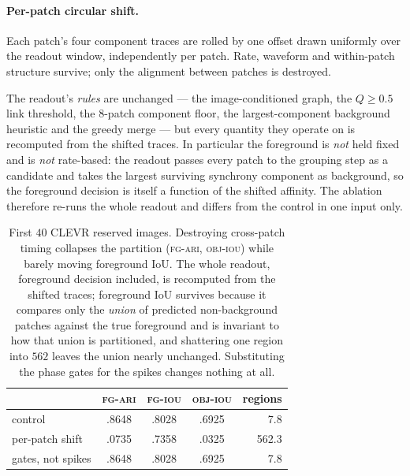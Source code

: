 \paragraph{Per-patch circular shift.}
Each patch's four component traces are rolled by one offset drawn uniformly over the readout
window, independently per patch. Rate, waveform and within-patch structure survive; only the
alignment between patches is destroyed.

The readout's \emph{rules} are unchanged --- the image-conditioned graph, the $Q\ge0.5$ link
threshold, the $8$-patch component floor, the largest-component background heuristic and the
greedy merge --- but every quantity they operate on is recomputed from the shifted traces. In
particular the foreground is \emph{not} held fixed and is \emph{not} rate-based: the readout
passes every patch to the grouping step as a candidate and takes the largest surviving synchrony
component as background, so the foreground decision is itself a function of the shifted affinity.
The ablation therefore re-runs the whole readout and differs from the control in one input only.

\begin{table}[!tb]
\centering
\small
\begin{tabular}{l ccc r}
\toprule
& \textsc{fg-ari} & \textsc{fg-iou} & \textsc{obj-iou} & regions \\
\midrule
control            & .8648 & .8028 & .6925 & 7.8 \\
per-patch shift    & .0735 & .7358 & .0325 & 562.3 \\
gates, not spikes  & .8648 & .8028 & .6925 & 7.8 \\
\bottomrule
\end{tabular}
\caption{First $40$ CLEVR reserved images. Destroying cross-patch timing collapses the partition
(\textsc{fg-ari}, \textsc{obj-iou}) while barely moving foreground IoU. The whole readout,
foreground decision included, is recomputed from the shifted traces; foreground IoU survives
because it compares only the \emph{union} of predicted non-background patches against the true
foreground and is invariant to how that union is partitioned, and shattering one region into
$562$ leaves the union nearly unchanged. Substituting the phase gates for the spikes changes
nothing at all.}
\label{tab:timing}
\end{table}


